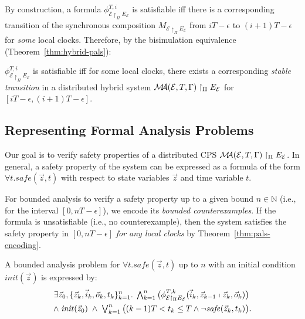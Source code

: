 By construction, a formula $\phi_{\mathcal{E} \restriction_{\Pi} E_\mathcal{E}}^{T,i}$ is satisfiable
iff there is a corresponding transition of the synchronous composition $M_{\mathcal{E} \restriction_{\Pi} E_\mathcal{E}}$
from $iT - \epsilon$ to $(i+1)T - \epsilon$ for \emph{some} local clocks.
Therefore, by  the bisimulation equivalence (Theorem~\ref{thm:hybrid-pals}):

\begin{theorem}\label{thm:pals-encoding}
$\phi_{\mathcal{E} \restriction_{\Pi} E_\mathcal{E}}^{T,i}$ is satisfiable 
iff for some local clocks, there exists a corresponding \emph{stable transition} in a distributed hybrid system  
$\mathcal{M}\!\!\mathcal{A}(\mathcal{E}, T, \Gamma) \restriction_{\Pi} E_\mathcal{E}$   for $[iT - \epsilon,(i+1)T - \epsilon]$.
\end{theorem}

\subsection{Representing Formal Analysis Problems}

Our goal is to verify safety properties
of a distributed CPS $\mathcal{M}\!\!\mathcal{A}(\mathcal{E}, T, \Gamma) \restriction_{\Pi} E_\mathcal{E}$.
In general, a safety property of the system can be expressed as a formula of the form 
$\forall t.  \mathit{safe}(\vec{z},t)$
with respect to state variables $\vec{z}$ and time variable $t$.


For bounded analysis
to verify %
a safety property %
up to a given bound $n \in \mathbb{N}$
(i.e., for the interval $[0,nT - \epsilon]$),
we encode its \emph{bounded counterexamples}. %
If the formula is unsatisfiable (i.e., no counterexample), 
then the system satisfies the safety property in $[0,nT - \epsilon]$
\emph{for any local clocks} by Theorem~\ref{thm:pals-encoding}.



\begin{definition}
A bounded analysis problem for $\forall t.  \mathit{safe}(\vec{z},t)$
up to $n$ with an initial condition $\mathit{init}(\vec{z})$
is expressed by:
\begin{align*}
\exists \vec{z}_0, \{\vec{z}_k, \vec{i}_k, \vec{o}_k, t_k\}_{k=1}^{n}.\;
\textstyle\bigwedge_{k=1}^{n}
\big(\phi_{\mathcal{E} \restriction_{\Pi} E_\mathcal{E}}^{T,k}(
	\vec{i}_k, \vec{z}_{k-1}
	\shortmid 
	\vec{z}_{k}, \vec{o}_k)\big)
\phantom{.}
\\
\wedge\;
\mathit{init}(\vec{z}_0)
\;\wedge\;
\textstyle\bigvee_{k=1}^{n}
\big(
(k-1)T < t_{k} \leq T
\wedge
\neg\mathit{safe}(\vec{z}_k, t_{k}) 
\big).
\end{align*}
\end{definition}


